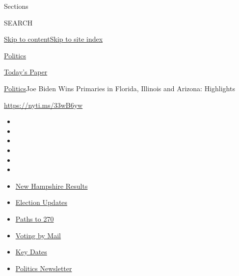 Sections

SEARCH

\protect\hyperlink{site-content}{Skip to
content}\protect\hyperlink{site-index}{Skip to site index}

\href{https://www.nytimes3xbfgragh.onion/section/politics}{Politics}

\href{https://myaccount.nytimes3xbfgragh.onion/auth/login?response_type=cookie\&client_id=vi}{}

\href{https://www.nytimes3xbfgragh.onion/section/todayspaper}{Today's
Paper}

\href{/section/politics}{Politics}\textbar{}Joe Biden Wins Primaries in
Florida, Illinois and Arizona: Highlights

\url{https://nyti.ms/33wB6yw}

\begin{itemize}
\item
\item
\item
\item
\item
\item
\end{itemize}

\begin{itemize}
\item
  \href{https://www.nytimes3xbfgragh.onion/interactive/2020/09/08/us/elections/results-new-hampshire-primary-elections.html?action=click\&pgtype=Article\&state=default\&region=TOP_BANNER\&context=storylines_menu}{New
  Hampshire Results}
\item
  \href{https://www.nytimes3xbfgragh.onion/live/2020/09/08/us/trump-vs-biden?action=click\&pgtype=Article\&state=default\&region=TOP_BANNER\&context=storylines_menu}{Election
  Updates}
\item
  \href{https://www.nytimes3xbfgragh.onion/interactive/2020/us/elections/election-states-biden-trump.html?action=click\&pgtype=Article\&state=default\&region=TOP_BANNER\&context=storylines_menu}{Paths
  to 270}
\item
  \href{https://www.nytimes3xbfgragh.onion/interactive/2020/08/31/us/politics/vote-by-mail-deadlines.html?action=click\&pgtype=Article\&state=default\&region=TOP_BANNER\&context=storylines_menu}{Voting
  by Mail}
\item
  \href{https://www.nytimes3xbfgragh.onion/interactive/2019/us/elections/2020-presidential-election-calendar.html?action=click\&pgtype=Article\&state=default\&region=TOP_BANNER\&context=storylines_menu}{Key
  Dates}
\item
  \href{https://www.nytimes3xbfgragh.onion/newsletters/politics?action=click\&pgtype=Article\&state=default\&region=TOP_BANNER\&context=storylines_menu}{Politics
  Newsletter}
\end{itemize}

